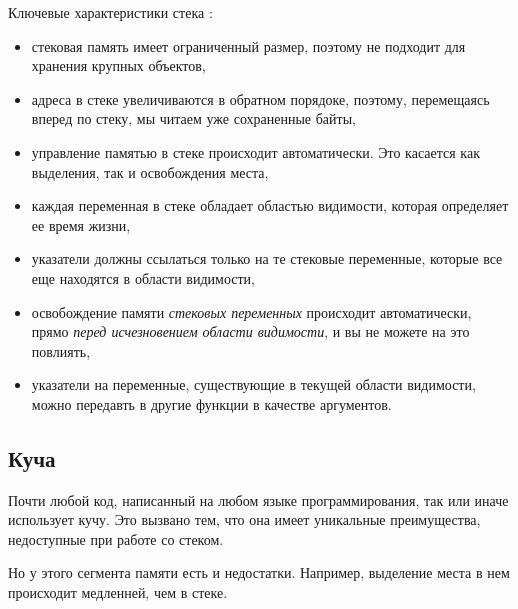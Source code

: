 \documentclass[%
	11pt,
	a4paper,
	utf8,
		]{article}
\begin{document}
Ключевые характеристики стека \cite[]{amini-extreme-c:2022}:
\begin{itemize}
	\item стековая память имеет ограниченный размер, поэтому не подходит для хранения крупных объектов,
	
	\item адреса в стеке увеличиваются в обратном порядоке, поэтому, перемещаясь вперед по стеку, мы читаем уже сохраненные байты,
	
	\item управление памятью в стеке происходит автоматически. Это касается как выделения, так и освобождения места,
	
	\item каждая переменная в стеке обладает областью видимости, которая определяет ее время жизни,
	
	\item указатели должны ссылаться только на те стековые переменные, которые все еще находятся в области видимости,
	
	\item освобождение памяти \emph{стековых переменных} происходит автоматически, прямо \emph{перед исчезновением области видимости}, и вы не можете на это повлиять,
	
	\item указатели на переменные, существующие в текущей области видимости, можно передавть в другие функции в качестве аргументов. 
\end{itemize}

\subsection{Куча}

Почти любой код, написанный на любом языке программирования, так или иначе использует кучу. Это вызвано тем, что она имеет уникальные преимущества, недоступные при работе со стеком.

Но у этого сегмента памяти есть и недостатки. Например, выделение места в нем происходит медленней, чем в стеке.
\end{document}
